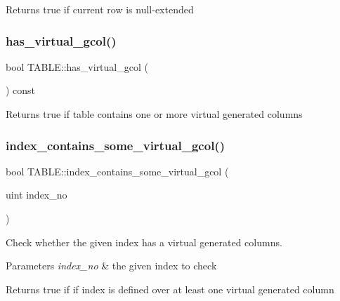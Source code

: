 \begin{DoxyReturn}{Returns}
true if current row is null-\/extended 
\end{DoxyReturn}
\mbox{\label{structTABLE_a6a653e5bb4044b0c8f1971bba39a97dd}} 
\subsubsection{\texorpdfstring{has\+\_\+virtual\+\_\+gcol()}{has\_virtual\_gcol()}}
{\footnotesize\ttfamily bool T\+A\+B\+L\+E\+::has\+\_\+virtual\+\_\+gcol (\begin{DoxyParamCaption}{ }\end{DoxyParamCaption}) const}

\begin{DoxyReturn}{Returns}
true if table contains one or more virtual generated columns 
\end{DoxyReturn}
\mbox{\label{structTABLE_a8c111124df42ff0b1749cea69411c8c0}} 
\subsubsection{\texorpdfstring{index\+\_\+contains\+\_\+some\+\_\+virtual\+\_\+gcol()}{index\_contains\_some\_virtual\_gcol()}}
{\footnotesize\ttfamily bool T\+A\+B\+L\+E\+::index\+\_\+contains\+\_\+some\+\_\+virtual\+\_\+gcol (\begin{DoxyParamCaption}\item[{uint}]{index\+\_\+no }\end{DoxyParamCaption})\hspace{0.3cm}{\ttfamily [inline]}}

Check whether the given index has a virtual generated columns.


\begin{DoxyParams}{Parameters}
{\em index\+\_\+no} & the given index to check\\
\hline
\end{DoxyParams}
\begin{DoxyReturn}{Returns}
true if if index is defined over at least one virtual generated column 
\end{DoxyReturn}
\mbox{\label{structTABLE_a4c6c0d87326e6006abe59c861c947ad3}} 
